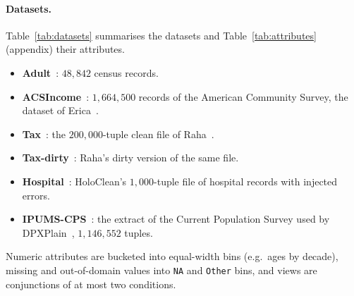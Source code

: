 \paragraph{Datasets.}
Table~\ref{tab:datasets} summarises the datasets and Table~\ref{tab:attributes} (appendix) their attributes.
\begin{itemize}[leftmargin=*,itemsep=1pt,topsep=2pt]
  \item \textbf{Adult}~\cite{adult-uci}: $48{,}842$ census records.
  \item \textbf{ACSIncome}~\cite{DingHMS21}: $1{,}664{,}500$ records of the American Community Survey, the dataset of Erica~\cite{LMSJ23,ERICA}.
  \item \textbf{Tax}~\cite{BohannonFGJK07}: the $200{,}000$-tuple clean file of Raha~\cite{MahdaviAFMOST19}.
  \item \textbf{Tax-dirty}~\cite{MahdaviAFMOST19}: Raha's dirty version of the same file.
  \item \textbf{Hospital}~\cite{rekatsinas2017}: HoloClean's $1{,}000$-tuple file of hospital records with injected errors.
  \item \textbf{IPUMS-CPS}~\cite{TaoGMR22}: the extract of the Current Population Survey used by DPXPlain~\cite{TaoGMR22}, $1{,}146{,}552$ tuples.
\end{itemize}
Numeric attributes are bucketed into equal-width bins (e.g.\ ages by decade), missing and out-of-domain values into \texttt{NA} and \texttt{Other} bins, and views are conjunctions of at most two conditions.

